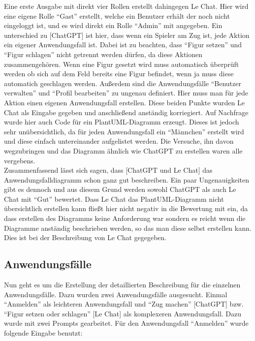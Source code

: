 Eine erste Ausgabe mit direkt vier Rollen erstellt dahingegen Le Chat. Hier wird eine eigene Rolle ``Gast'' erstellt, welche ein Benutzer erhält der noch nicht eingeloggt ist, und 
es wird direkt ein Rolle ``Admin'' mit angegeben. Ein unterschied zu [ChatGPT] ist hier, dass wenn ein Spieler am Zug ist, jede Aktion ein eigener Anwendungsfall
ist. Dabei ist zu beachten, dass ``Figur setzen'' und ``Figur schlagen'' nicht getrennt werden dürfen, da diese Aktionen zusammengehören. Wenn eine Figur gesetzt 
wird muss automatisch überprüft werden ob sich auf dem Feld bereits eine Figur befindet, wenn ja muss diese automatich geschlagen werden. Außerdem sind die 
Anwendungsfälle ``Benutzer verwalten'' und ``Profil bearbeiten'' zu ungenau definiert. Hier muss man für jede Aktion einen eigenen Anwendungsfall erstellen. Diese beiden Punkte wurden 
Le Chat als Eingabe gegeben und anschließend anständig korriegiert. Auf Nachfrage wurde hier auch Code für ein PlantUML-Diagramm erzeugt. Dieses ist jedoch sehr
unübersichtlich, da für jeden Anwendungsfall ein ``Männchen'' erstellt wird und diese einfach untereinander aufgelistet werden. Die Versuche, ihn davon wegzubringen 
und das Diagramm ähnlich wie ChatGPT zu erstellen waren alle vergebens.\\

Zusammenfassend lässt sich sagen, dass [ChatGPT und Le Chat] das Anwendungsfalldiagramm schon ganz gut beschreiben. Ein paar Ungenauigkeiten gibt es dennoch und aus 
diesem Grund werden sowohl ChatGPT als auch Le Chat mit ``Gut'' bewertet. Dass Le Chat das PlantUML-Diagramm nicht übersichtlich erstellen kann fließt hier nicht
negativ in die Bewertung mit ein, da dass erstellen des Diagramms keine Anforderung war sondern es reicht wenn die Diagramme anständig beschrieben werden, so das man 
diese selbst erstellen kann. Dies ist bei der Beschreibung von Le Chat gegegeben.

\subsection*{Anwendungsfälle}

Nun geht es um die Erstellung der detaillierten Beschreibung für die einzelnen Anwendungsfälle. Dazu wurden zwei Anwendungsfälle ausgesucht.
Einmal ``Anmelden'' als leichteren Anwendungsfall und ``Zug machen'' [ChatGPT] bzw. ``Figur setzen oder schlagen'' [Le Chat] 
als komplexeren Anwendungsfall. Dazu wurde mit zwei Prompts gearbeitet. Für den Anwendungsfall ``Anmelden'' wurde folgende Eingabe benutzt:

